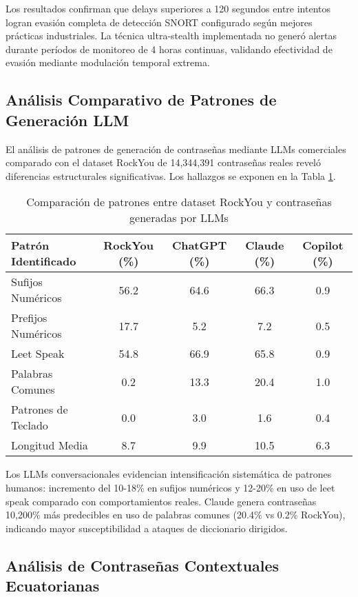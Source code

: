 Los resultados confirman que delays superiores a 120 segundos entre intentos logran evasión completa de detección SNORT configurado según mejores prácticas industriales. La técnica ultra-stealth implementada no generó alertas durante períodos de monitoreo de 4 horas continuas, validando efectividad de evasión mediante modulación temporal extrema.

\subsection{Análisis Comparativo de Patrones de Generación LLM}

El análisis de patrones de generación de contraseñas mediante LLMs comerciales comparado con el dataset RockYou de 14,344,391 contraseñas reales reveló diferencias estructurales significativas. Los hallazgos se exponen en la Tabla \ref{tab:llm_pattern_comparison}.

\begin{table}[h]
\centering
\caption{Comparación de patrones entre dataset RockYou y contraseñas generadas por LLMs}
\label{tab:llm_pattern_comparison}
\begin{tabular}{|l|c|c|c|c|}
\hline
\textbf{Patrón Identificado} & \textbf{RockYou (\%)} & \textbf{ChatGPT (\%)} & \textbf{Claude (\%)} & \textbf{Copilot (\%)} \\
\hline
Sufijos Numéricos & 56.2 & 64.6 & 66.3 & 0.9 \\
\hline
Prefijos Numéricos & 17.7 & 5.2 & 7.2 & 0.5 \\
\hline
Leet Speak & 54.8 & 66.9 & 65.8 & 0.9 \\
\hline
Palabras Comunes & 0.2 & 13.3 & 20.4 & 1.0 \\
\hline
Patrones de Teclado & 0.0 & 3.0 & 1.6 & 0.4 \\
\hline
Longitud Media & 8.7 & 9.9 & 10.5 & 6.3 \\
\hline
\end{tabular}
\end{table}

Los LLMs conversacionales evidencian intensificación sistemática de patrones humanos: incremento del 10-18\% en sufijos numéricos y 12-20\% en uso de leet speak comparado con comportamientos reales. Claude genera contraseñas 10,200\% más predecibles en uso de palabras comunes (20.4\% vs 0.2\% RockYou), indicando mayor susceptibilidad a ataques de diccionario dirigidos.

\subsection{Análisis de Contraseñas Contextuales Ecuatorianas}

